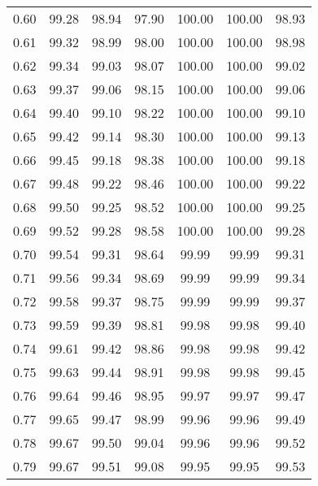 \begin{tabular}{|c|c|c|c|c|c|c|}
      0.60 &     99.28 &     98.94 &      97.90 &  100.00 &     100.00 &         98.93 \\
      0.61 &     99.32 &     98.99 &      98.00 &  100.00 &     100.00 &         98.98 \\
      0.62 &     99.34 &     99.03 &      98.07 &  100.00 &     100.00 &         99.02 \\
      0.63 &     99.37 &     99.06 &      98.15 &  100.00 &     100.00 &         99.06 \\
      0.64 &     99.40 &     99.10 &      98.22 &  100.00 &     100.00 &         99.10 \\
      0.65 &     99.42 &     99.14 &      98.30 &  100.00 &     100.00 &         99.13 \\
      0.66 &     99.45 &     99.18 &      98.38 &  100.00 &     100.00 &         99.18 \\
      0.67 &     99.48 &     99.22 &      98.46 &  100.00 &     100.00 &         99.22 \\
      0.68 &     99.50 &     99.25 &      98.52 &  100.00 &     100.00 &         99.25 \\
      0.69 &     99.52 &     99.28 &      98.58 &  100.00 &     100.00 &         99.28 \\
      0.70 &     99.54 &     99.31 &      98.64 &   99.99 &      99.99 &         99.31 \\
      0.71 &     99.56 &     99.34 &      98.69 &   99.99 &      99.99 &         99.34 \\
      0.72 &     99.58 &     99.37 &      98.75 &   99.99 &      99.99 &         99.37 \\
      0.73 &     99.59 &     99.39 &      98.81 &   99.98 &      99.98 &         99.40 \\
      0.74 &     99.61 &     99.42 &      98.86 &   99.98 &      99.98 &         99.42 \\
      0.75 &     99.63 &     99.44 &      98.91 &   99.98 &      99.98 &         99.45 \\
      0.76 &     99.64 &     99.46 &      98.95 &   99.97 &      99.97 &         99.47 \\
      0.77 &     99.65 &     99.47 &      98.99 &   99.96 &      99.96 &         99.49 \\
      0.78 &     99.67 &     99.50 &      99.04 &   99.96 &      99.96 &         99.52 \\
      0.79 &     99.67 &     99.51 &      99.08 &   99.95 &      99.95 &         99.53 \\

\end{tabular}
